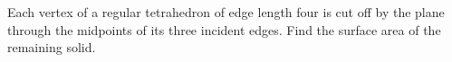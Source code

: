 Each vertex of a regular tetrahedron of edge length four is cut off by the plane through the midpoints of its three incident edges. Find the surface area of the remaining solid.
